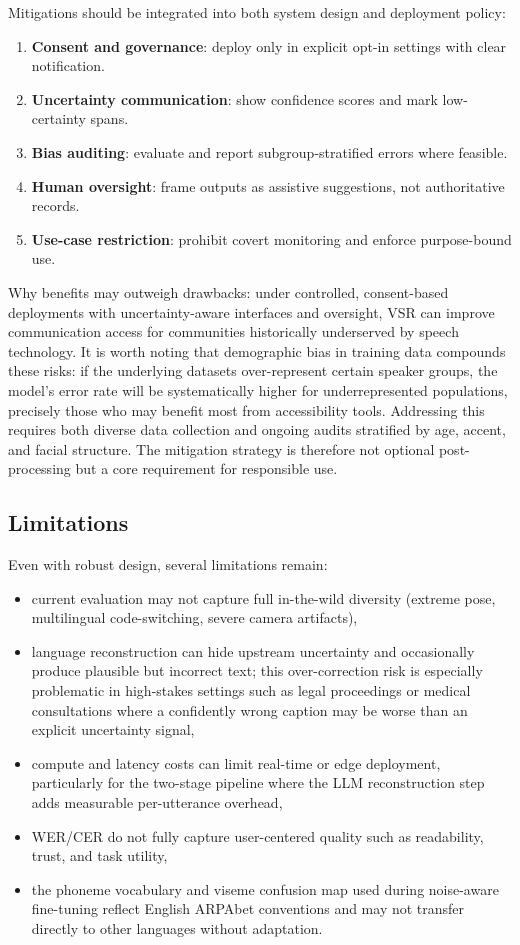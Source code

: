 \documentclass[10pt,twocolumn,letterpaper]{article}
\begin{document}
Mitigations should be integrated into both system design and deployment policy:
\begin{enumerate}[leftmargin=*]
    \item \textbf{Consent and governance}: deploy only in explicit opt-in settings with clear notification.
    \item \textbf{Uncertainty communication}: show confidence scores and mark low-certainty spans.
    \item \textbf{Bias auditing}: evaluate and report subgroup-stratified errors where feasible.
    \item \textbf{Human oversight}: frame outputs as assistive suggestions, not authoritative records.
    \item \textbf{Use-case restriction}: prohibit covert monitoring and enforce purpose-bound use.
\end{enumerate}

Why benefits may outweigh drawbacks: under controlled, consent-based deployments with uncertainty-aware interfaces and oversight, VSR can improve communication access for communities historically underserved by speech technology. It is worth noting that demographic bias in training data compounds these risks: if the underlying datasets over-represent certain speaker groups, the model's error rate will be systematically higher for underrepresented populations, precisely those who may benefit most from accessibility tools. Addressing this requires both diverse data collection and ongoing audits stratified by age, accent, and facial structure. The mitigation strategy is therefore not optional post-processing but a core requirement for responsible use.

\subsection{Limitations}
Even with robust design, several limitations remain:
\begin{itemize}[leftmargin=*]
    \item current evaluation may not capture full in-the-wild diversity (extreme pose, multilingual code-switching, severe camera artifacts),
    \item language reconstruction can hide upstream uncertainty and occasionally produce plausible but incorrect text; this over-correction risk is especially problematic in high-stakes settings such as legal proceedings or medical consultations where a confidently wrong caption may be worse than an explicit uncertainty signal,
    \item compute and latency costs can limit real-time or edge deployment, particularly for the two-stage pipeline where the LLM reconstruction step adds measurable per-utterance overhead,
    \item WER/CER do not fully capture user-centered quality such as readability, trust, and task utility,
    \item the phoneme vocabulary and viseme confusion map used during noise-aware fine-tuning reflect English ARPAbet conventions and may not transfer directly to other languages without adaptation.
\end{itemize}
\end{document}

